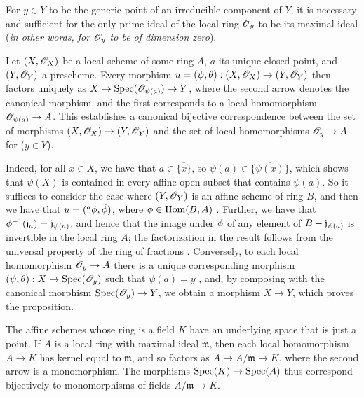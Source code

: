 \begin{corollary}[2.4.3]
\label{I.2.4.3}
For $y\in Y$ to be the generic point of an irreducible component of $Y$, it is necessary and sufficient for the only prime ideal of the local ring $\mathscr{O}_y$ to be its maximal ideal (\emph{in other words, for $\mathscr{O}_y$ to be of \emph{dimension zero}}).
\end{corollary}

\begin{proposition}[2.4.4]
\label{I.2.4.4}
Let $(X,\mathscr{O}_X)$ be a local scheme of some ring $A$, $a$ its unique closed point, and $(Y,\mathscr{O}_Y)$ a prescheme.
Every morphism $u=(\psi,\theta):(X,\sh{O}_X)\to(Y,\sh{O}_Y)$ then factors uniquely as $X\to\Spec(\sh{O}_{\psi(a)})\to Y$, where the second arrow denotes the canonical morphism, and the first corresponds to a local homomorphism $\sh{O}_{\psi(a)}\to A$.
This establishes a canonical bijective correspondence between the set of morphisms $(X,\sh{O}_X)\to(Y,\sh{O}_Y)$ and the set of local homomorphisms $\sh{O}_y\to A$ for ($y\in Y$).
\end{proposition}

Indeed, for all $x\in X$, we have that $a\in\overline{\{x\}}$, so $\psi(a)\in\overline{\{\psi(x)\}}$, which shows that $\psi(X)$ is contained in every affine open subset that contains $\psi(a)$.
So it suffices to consider the case where $(Y,\mathscr{O}_Y)$ is an affine scheme of ring $B$, and then we have that $u=({}^a\phi,\tilde{\phi})$, where $\phi\in\operatorname{Hom}(B,A)$ .
Further, we have that $\phi^{-1}(\mathfrak{j}_a)=\mathfrak{j}_{\psi(a)}$, and hence that the image under $\phi$ of any element of $B-\mathfrak{j}_{\psi(a)}$ is invertible in the local ring $A$;
the factorization in the result follows from the universal property of the ring of fractions .
Conversely, to each local homomorphism $\sh{O}_y\to A$ there is a unique corresponding morphism $(\psi,\theta):X\to\Spec(\sh{O}_y)$ such that $\psi(a)=y$ , and, by composing with the canonical morphism $\Spec(\sh{O}_y)\to Y$, we obtain a morphism $X\to Y$, which proves the proposition.

\begin{env}[2.4.5]
\label{I.2.4.5}
The affine schemes whose ring is a field $K$ have an underlying space that is just a point.
If $A$ is a local ring with maximal ideal $\mathfrak{m}$, then each local homomorphism $A\to K$ has kernel equal to $\mathfrak{m}$, and so factors as $A\to A/\mathfrak{m}\to K$, where the second arrow is a monomorphism.
The morphisms $\Spec(K)\to\Spec(A)$ thus correspond bijectively to monomorphisms of fields $A/\mathfrak{m}\to K$.
\end{env}

